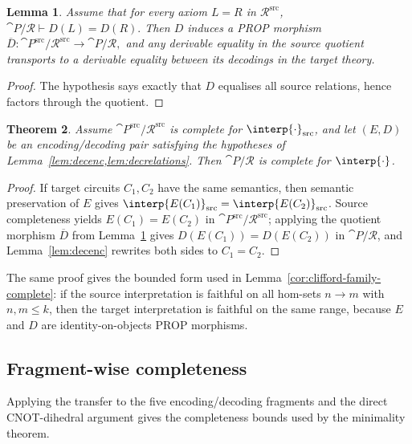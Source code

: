 \documentclass[10pt,a4paper]{article}
\newtheorem{theorem}{Theorem}
\newtheorem{lemma}[theorem]{Lemma}
\def\cref#1{Lemma~\ref{#1}}%
\begin{document}
\begin{lemma}\label{lem:decrelations}
Assume that for every axiom \(L=R\) in \(\mathcal{R}^{\mathrm{src}}\),
\(
  \cat{P}/\mathcal{R}\vdash D(L) = D(R).
\)
Then \(D\) induces a PROP morphism
\(
  \overline{D}:\cat{P}^{\mathrm{src}}/\mathcal{R}^{\mathrm{src}}\to\cat{P}/\mathcal{R},
\)
and any derivable equality in the source quotient transports to a derivable equality between its
decodings in the target theory.
\end{lemma}
\begin{proof}
The hypothesis says exactly that \(D\) equalises all source relations, hence factors through the
quotient.
\end{proof}

\begin{theorem}\label{th:completeness}
Assume \(\cat{P}^{\mathrm{src}}/\mathcal{R}^{\mathrm{src}}\) is complete for
\(\interp{\cdot}_{\mathrm{src}}\), and let \((E,D)\) be an encoding/decoding pair satisfying the
hypotheses of \cref{lem:decenc,lem:decrelations}.  Then \(\cat{P}/\mathcal{R}\) is complete for
\(\interp{\cdot}\).
\end{theorem}
\begin{proof}
If target circuits \(C_1,C_2\) have the same semantics, then semantic preservation of \(E\) gives
\(\interp{E(C_1)}_{\mathrm{src}}=\interp{E(C_2)}_{\mathrm{src}}\).  Source completeness yields
\(E(C_1)=E(C_2)\) in
\(\cat{P}^{\mathrm{src}}/\mathcal{R}^{\mathrm{src}}\); applying the quotient morphism
\(\overline{D}\) from \cref{lem:decrelations} gives \(D(E(C_1))=D(E(C_2))\) in
\(\cat{P}/\mathcal{R}\), and \cref{lem:decenc} rewrites both sides to \(C_1=C_2\).
\end{proof}

The same proof gives the bounded form used in \cref{cor:clifford-family-complete}: if the source
interpretation is faithful on all hom-sets \(n\to m\) with \(n,m\le k\), then the target
interpretation is faithful on the same range, because \(E\) and \(D\) are identity-on-objects PROP
morphisms.

\subsection{Fragment-wise completeness}

Applying the transfer to the five encoding/decoding fragments and the direct CNOT-dihedral
argument gives the completeness bounds used by the minimality theorem.
\end{document}
